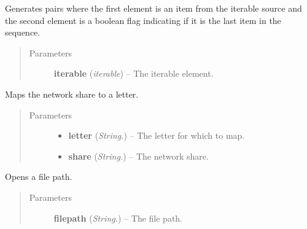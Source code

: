 \documentclass[letterpaper,10pt,english]{sphinxmanual}
\begin{document}

\begin{fulllineitems}
\label{api:utils.IterIsLast}
Generates pairs where the first element is an item from the iterable
source and the second element is a boolean flag indicating if it is the
last item in the sequence.
\begin{quote}\begin{description}
\item[{Parameters}] \leavevmode
\textbf{iterable} (\emph{iterable}) -- The iterable element.

\end{description}\end{quote}

\end{fulllineitems}


\begin{fulllineitems}
\label{api:utils.MapNetworkShare}
Maps the network share to a letter.
\begin{quote}\begin{description}
\item[{Parameters}] \leavevmode\begin{itemize}
\item {} 
\textbf{letter} (\emph{String.}) -- The letter for which to map.

\item {} 
\textbf{share} (\emph{String.}) -- The network share.

\end{itemize}

\end{description}\end{quote}

\end{fulllineitems}


\begin{fulllineitems}
\label{api:utils.OpenFile}
Opens a file path.
\begin{quote}\begin{description}
\item[{Parameters}] \leavevmode
\textbf{filepath} (\emph{String.}) -- The file path.

\end{description}\end{quote}

\end{fulllineitems}
\end{document}
